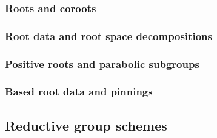         \subsubsection{Roots and coroots}
        
        \subsubsection{Root data and root space decompositions}
        
        \subsubsection{Positive roots and parabolic subgroups}
        
        \subsubsection{Based root data and pinnings}
    
    \subsection{Reductive group schemes}